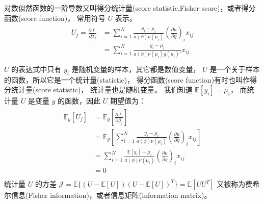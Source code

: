 \documentclass[letterpaper,10pt,english]{sphinxmanual}
\begin{document}
对数似然函数的一阶导数又叫得分统计量(score statistic,Fisher score)，或者得分函数(score function)，
常用符号 \(U\) 表示。
\begin{align}\label{equation:广义线性模型/estimate:eq_glm_estimate_ll_score}\!\begin{aligned}
U_j = \frac{\partial \ell}{\partial \beta_j}
&= \sum_{i=1}^N \frac{y_i-\mu_i}{a(\phi) \nu(\mu_i) } \left ( \frac{\partial \mu}{\partial \eta} \right )_i x_{ij}\\
&= \sum_{i=1}^N \frac{y_i-\mu_i}{a(\phi) \nu(\mu_i) g(\mu_i)'}  x_{ij}\\
\end{aligned}\end{align}
\(U\) 的表达式中只有 \(y_i\) 是随机变量的样本，其它都是数值变量，
\(U\) 是一个关于样本的函数，所以它是一个统计量(statistic)，
得分函数(score function)有时也叫作得分统计量(score statistic)，
统计量也是随机变量。
我们知道 \(\mathbb{E}[y_i]=\mu_i\)，
而统计量 \(U\) 是变量 \(y\) 的函数，因此 \(U\) 期望值为：
\begin{align}\label{equation:广义线性模型/estimate:广义线性模型/estimate:8}\!\begin{aligned}
\mathbb{E}_{y}[U_j] &= \mathbb{E}_{y} \left [ \frac{\partial \ell}{\partial \beta_j} \right ]\\
&= \mathbb{E}_{y} \left [ \sum_{i=1}^N \frac{y_i-\mu_i}{a(\phi) \nu(\mu_i) }
      \left ( \frac{\partial \mu}{\partial \eta} \right )_i x_{ij}  \right ]\\
&= \sum_{i=1}^N \frac{ \mathbb{E}[y_i]-\mu_i}{a(\phi) \nu(\mu_i) } \left ( \frac{\partial \mu}{\partial \eta} \right )_i x_{ij}\\
&= 0\\
\end{aligned}\end{align}
统计量 \(U\) 的方差 \(\mathcal{J}=\mathbb{E}\{(U-\mathbb{E}[U])(U-\mathbb{E}[U])^T \}=\mathbb{E}[UU^T]\)
又被称为费希尔信息(Fisher information)，或者信息矩阵(information matrix)。
\end{document}
